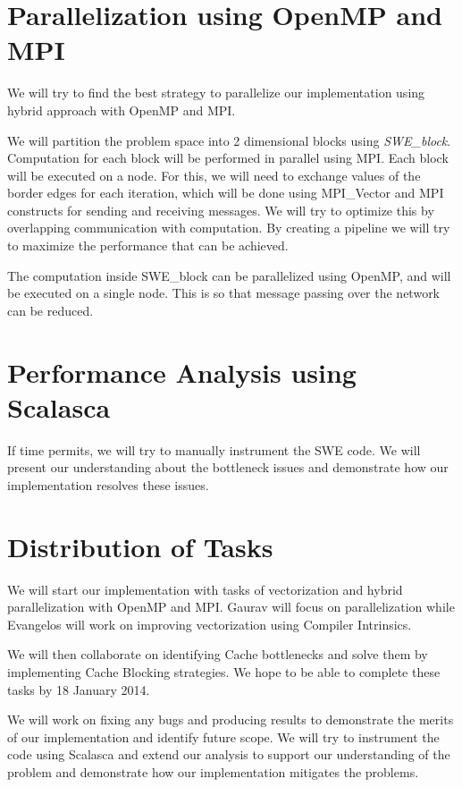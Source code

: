 \documentclass[]{article}
\begin{document}
\section{Parallelization using OpenMP and MPI}
We will try to find the best strategy to parallelize our implementation using hybrid
approach with OpenMP and MPI. 

We will partition the problem space into 2 dimensional blocks using \textit{SWE\_block}. Computation
for each block will be performed in parallel using MPI. Each block will be executed on a node.
For this, we will need to exchange values of the border edges for each iteration, which will
be done using MPI\_Vector and MPI constructs for sending and receiving messages. We will try
to optimize this by overlapping communication with computation.
By creating a pipeline we will try to maximize the performance that can be achieved.

The computation inside SWE\_block can be parallelized
using OpenMP, and will be executed on a single node. This is so that message passing
over the network can be reduced.

\section{Performance Analysis using Scalasca}
If time permits, we will try to manually instrument the SWE code. We will present our
understanding about the bottleneck issues and demonstrate how our implementation
resolves these issues.

\section{Distribution of Tasks}
We will start our implementation with tasks of vectorization and hybrid parallelization
with OpenMP and MPI. Gaurav will focus on parallelization while Evangelos will work
on improving vectorization using Compiler Intrinsics. 

We will then collaborate on identifying Cache bottlenecks and solve them by implementing
Cache Blocking strategies. We hope to be able to complete these tasks by 18 January 2014.

We will work on fixing any bugs and producing results to demonstrate the merits of our
implementation and identify future scope. We will try to instrument the code using Scalasca
and extend our analysis to support our understanding of the problem and demonstrate how our implementation mitigates the problems.
\end{document}
